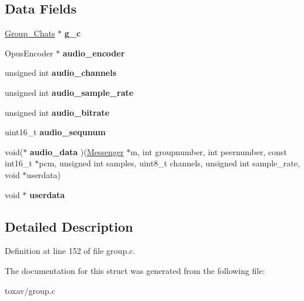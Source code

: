 \subsection*{Data Fields}
\begin{DoxyCompactItemize}
\item 
\hypertarget{struct_group___a_v_a0220ceb497e4d7ffcbd301959cbfaf26}{\hyperlink{struct_group___chats}{Group\+\_\+\+Chats} $\ast$ {\bfseries g\+\_\+c}}\label{struct_group___a_v_a0220ceb497e4d7ffcbd301959cbfaf26}

\item 
\hypertarget{struct_group___a_v_a8c1fa3d73f3426ba5cac83857c390ebc}{Opus\+Encoder $\ast$ {\bfseries audio\+\_\+encoder}}\label{struct_group___a_v_a8c1fa3d73f3426ba5cac83857c390ebc}

\item 
\hypertarget{struct_group___a_v_a7b6aa0a517a158485dccd6ce0a916e0e}{unsigned int {\bfseries audio\+\_\+channels}}\label{struct_group___a_v_a7b6aa0a517a158485dccd6ce0a916e0e}

\item 
\hypertarget{struct_group___a_v_a0562d75f5e3bb5cce19ab1eae44fdaac}{unsigned int {\bfseries audio\+\_\+sample\+\_\+rate}}\label{struct_group___a_v_a0562d75f5e3bb5cce19ab1eae44fdaac}

\item 
\hypertarget{struct_group___a_v_a1e39921527f07befd08d913c63b397a9}{unsigned int {\bfseries audio\+\_\+bitrate}}\label{struct_group___a_v_a1e39921527f07befd08d913c63b397a9}

\item 
\hypertarget{struct_group___a_v_a4e6b863a96b5fadfc86cc2ef353c76db}{uint16\+\_\+t {\bfseries audio\+\_\+sequnum}}\label{struct_group___a_v_a4e6b863a96b5fadfc86cc2ef353c76db}

\item 
\hypertarget{struct_group___a_v_a2ae2d081bbdd51062bcb82ea4a55eec5}{void($\ast$ {\bfseries audio\+\_\+data} )(\hyperlink{struct_messenger}{Messenger} $\ast$m, int groupnumber, int peernumber, const int16\+\_\+t $\ast$pcm, unsigned int samples, uint8\+\_\+t channels, unsigned int sample\+\_\+rate, void $\ast$userdata)}\label{struct_group___a_v_a2ae2d081bbdd51062bcb82ea4a55eec5}

\item 
\hypertarget{struct_group___a_v_afd0ffb02780e738d4c0a10ab833b7834}{void $\ast$ {\bfseries userdata}}\label{struct_group___a_v_afd0ffb02780e738d4c0a10ab833b7834}

\end{DoxyCompactItemize}


\subsection{Detailed Description}


Definition at line 152 of file group.\+c.



The documentation for this struct was generated from the following file\+:\begin{DoxyCompactItemize}
\item 
toxav/group.\+c\end{DoxyCompactItemize}

